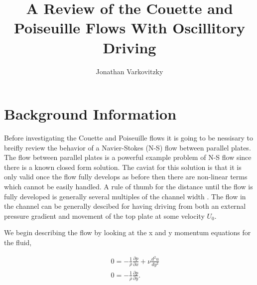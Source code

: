 \documentclass[a4paper,12pt,titlepage]{article}
\begin{document}
\newcommand{\ul}{\underline}
\newcommand{\p}{\partial}

\title{A Review of the Couette and Poiseuille Flows With Oscillitory Driving}
\author{Jonathan Varkovitzky}
\maketitle


\pagestyle{plain} %
\tableofcontents

\newpage

\setcounter{page}{2}





\section{Background Information}

Before investigating the Couette and Poiseuille flows it is going to be nessisary to breifly review the behavior of a Navier-Stokes (N-S) flow between parallel plates.  The flow between parallel plates is a powerful example problem of N-S flow since there is a known closed form solution. The caviat for this solution is that it is only valid once the flow fully develops as before then there are non-linear terms which cannot be easily handled.  A rule of thumb for the distance until the flow is fully developed is generally several multiples of the channel width \cite{kundu}.  The flow in the channel can be generally descibed for having driving from both an external pressure gradient and movement of the top plate at some velocity $U_0$.

We begin describing the flow by looking at the x and y momentum equations for the fluid,

\begin{eqnarray}
&& 0 = -\frac{1}{\rho} \frac{\p p}{\p x} + \nu \frac{d^2 u}{dy^2}\nonumber \\
&& 0 = -\frac{1}{\rho} \frac{\p p}{\p y}.
\end{eqnarray}
\end{document}

